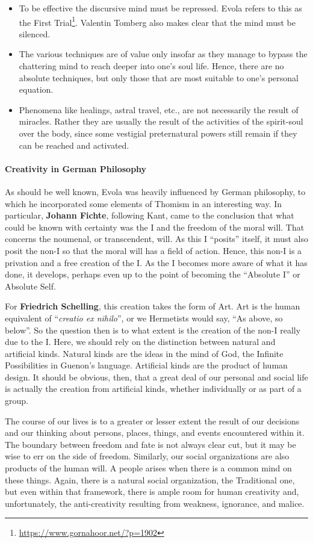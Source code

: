 \begin{itemize}
\item To be effective the discursive mind must be repressed. Evola refers to this as the First Trial\footnote{\url{https://www.gornahoor.net/?p=1902}}. Valentin Tomberg also makes clear that the mind must be silenced. 
\item The various techniques are of value only insofar as they manage to bypass the chattering mind to reach deeper into one's soul life. Hence, there are no absolute techniques, but only those that are most suitable to one's personal equation. 
\item Phenomena like healings, astral travel, etc., are not necessarily the result of miracles. Rather they are usually the result of the activities of the spirit-soul over the body, since some vestigial preternatural powers still remain if they can be reached and activated. 
\end{itemize}
\paragraph{Creativity in German Philosophy}
As should be well known, Evola was heavily influenced by German philosophy, to which he incorporated some elements of Thomism in an interesting way. In particular, \textbf{Johann Fichte}, following Kant, came to the conclusion that what could be known with certainty was the I and the freedom of the moral will. That concerns the noumenal, or transcendent, will. As this I “posits” itself, it must also posit the non-I so that the moral will has a field of action. Hence, this non-I is a privation and a free creation of the I. As the I becomes more aware of what it has done, it develops, perhaps even up to the point of becoming the “Absolute I” or Absolute Self.

For \textbf{Friedrich Schelling}, this creation takes the form of Art. Art is the human equivalent of “\emph{creatio ex nihilo}”, or we Hermetists would say, “As above, so below”. So the question then is to what extent is the creation of the non-I really due to the I. Here, we should rely on the distinction between natural and artificial kinds. Natural kinds are the ideas in the mind of God, the Infinite Possibilities in Guenon's language. Artificial kinds are the product of human design. It should be obvious, then, that a great deal of our personal and social life is actually the creation from artificial kinds, whether individually or as part of a group.

The course of our lives is to a greater or lesser extent the result of our decisions and our thinking about persons, places, things, and events encountered within it. The boundary between freedom and fate is not always clear cut, but it may be wise to err on the side of freedom. Similarly, our social organizations are also products of the human will. A people arises when there is a common mind on these things. Again, there is a natural social organization, the Traditional one, but even within that framework, there is ample room for human creativity and, unfortunately, the anti-creativity resulting from weakness, ignorance, and malice.

